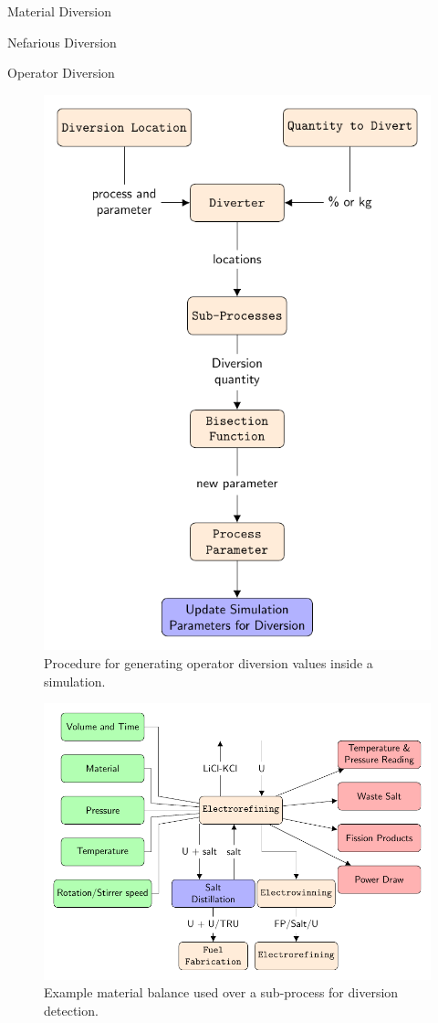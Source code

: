 \documentclass[final]{beamer}
\newlength{\onecolwid}
\newlength{\threecolwid}
\begin{document}
\begin{frame}[t]
\begin{columns}[t,totalwidth=\threecolwid]
\begin{column}{\onecolwid}
\begin{block}{Material Diversion}
\begin{block} {Nefarious Diversion}
	\end{block}
	\begin{block} {Operator Diversion}
		\begin{figure}
			\includegraphics[width=0.8\linewidth]{op-diversion}
			\caption{Procedure for generating operator diversion values inside a simulation.}
		\end{figure}
		\begin{figure}
			\includegraphics[width=\linewidth]{refining}
			\caption{Example material balance used over a sub-process for diversion detection.}
		\end{figure}
	\end{block}


\end{block}
\end{column}
\end{columns}
\end{frame}
\end{document}
